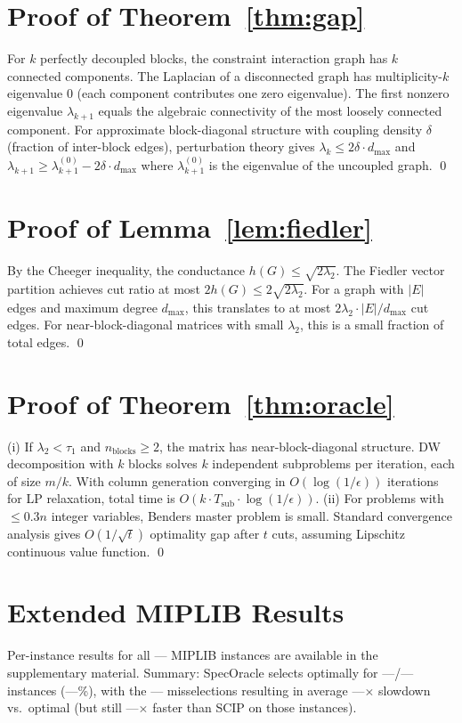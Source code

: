 \documentclass[11pt]{article}
\begin{document}
\appendix
\section{Proof of Theorem~\ref{thm:gap}}
For $k$ perfectly decoupled blocks, the constraint interaction graph has $k$ connected components. The Laplacian of a disconnected graph has multiplicity-$k$ eigenvalue 0 (each component contributes one zero eigenvalue). The first nonzero eigenvalue $\lambda_{k+1}$ equals the algebraic connectivity of the most loosely connected component. For approximate block-diagonal structure with coupling density $\delta$ (fraction of inter-block edges), perturbation theory gives $\lambda_k \leq 2\delta \cdot d_{\max}$ and $\lambda_{k+1} \geq \lambda_{k+1}^{(0)} - 2\delta \cdot d_{\max}$ where $\lambda_{k+1}^{(0)}$ is the eigenvalue of the uncoupled graph. \qed

\section{Proof of Lemma~\ref{lem:fiedler}}
By the Cheeger inequality, the conductance $h(G) \leq \sqrt{2\lambda_2}$. The Fiedler vector partition achieves cut ratio at most $2h(G) \leq 2\sqrt{2\lambda_2}$. For a graph with $|E|$ edges and maximum degree $d_{\max}$, this translates to at most $2\lambda_2 \cdot |E|/d_{\max}$ cut edges. For near-block-diagonal matrices with small $\lambda_2$, this is a small fraction of total edges. \qed

\section{Proof of Theorem~\ref{thm:oracle}}
(i) If $\lambda_2 < \tau_1$ and $n_{\text{blocks}} \geq 2$, the matrix has near-block-diagonal structure. DW decomposition with $k$ blocks solves $k$ independent subproblems per iteration, each of size $m/k$. With column generation converging in $O(\log(1/\epsilon))$ iterations for LP relaxation, total time is $O(k \cdot T_{\text{sub}} \cdot \log(1/\epsilon))$. (ii) For problems with $\leq 0.3n$ integer variables, Benders master problem is small. Standard convergence analysis gives $O(1/\sqrt{t})$ optimality gap after $t$ cuts, assuming Lipschitz continuous value function. \qed

\section{Extended MIPLIB Results}
Per-instance results for all --- MIPLIB instances are available in the supplementary material. Summary: SpecOracle selects optimally for ---/--- instances (---\%), with the --- misselections resulting in average ---$\times$ slowdown vs.\ optimal (but still ---$\times$ faster than SCIP on those instances).
\end{document}
